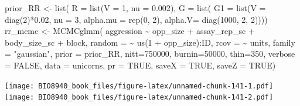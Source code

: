 \documentclass[
  12pt,
]{book}
\newenvironment{Shaded}{\begin{snugshade}}{\end{snugshade}}
\newcommand{\AttributeTok}[1]{\textcolor[rgb]{0.77,0.63,0.00}{#1}}
\newcommand{\ConstantTok}[1]{\textcolor[rgb]{0.00,0.00,0.00}{#1}}
\newcommand{\DecValTok}[1]{\textcolor[rgb]{0.00,0.00,0.81}{#1}}
\newcommand{\FloatTok}[1]{\textcolor[rgb]{0.00,0.00,0.81}{#1}}
\newcommand{\FunctionTok}[1]{\textcolor[rgb]{0.00,0.00,0.00}{#1}}
\newcommand{\NormalTok}[1]{#1}
\newcommand{\OtherTok}[1]{\textcolor[rgb]{0.56,0.35,0.01}{#1}}
\newcommand{\SpecialCharTok}[1]{\textcolor[rgb]{0.00,0.00,0.00}{#1}}
\newcommand{\StringTok}[1]{\textcolor[rgb]{0.31,0.60,0.02}{#1}}
\begin{document}
\begin{Shaded}
\begin{Highlighting}[]
\NormalTok{prior\_RR }\OtherTok{\textless{}{-}} \FunctionTok{list}\NormalTok{(}
  \AttributeTok{R =} \FunctionTok{list}\NormalTok{(}\AttributeTok{V =} \DecValTok{1}\NormalTok{, }\AttributeTok{nu =} \FloatTok{0.002}\NormalTok{),}
  \AttributeTok{G =} \FunctionTok{list}\NormalTok{(}
    \AttributeTok{G1 =} \FunctionTok{list}\NormalTok{(}\AttributeTok{V =} \FunctionTok{diag}\NormalTok{(}\DecValTok{2}\NormalTok{)}\SpecialCharTok{*}\FloatTok{0.02}\NormalTok{, }\AttributeTok{nu =} \DecValTok{3}\NormalTok{,}
\AttributeTok{alpha.mu =} \FunctionTok{rep}\NormalTok{(}\DecValTok{0}\NormalTok{, }\DecValTok{2}\NormalTok{),}
\AttributeTok{alpha.V=} \FunctionTok{diag}\NormalTok{(}\DecValTok{1000}\NormalTok{, }\DecValTok{2}\NormalTok{, }\DecValTok{2}\NormalTok{))))}
\NormalTok{rr\_mcmc }\OtherTok{\textless{}{-}} \FunctionTok{MCMCglmm}\NormalTok{(}
\NormalTok{  aggression }\SpecialCharTok{\textasciitilde{}}\NormalTok{ opp\_size }\SpecialCharTok{+}\NormalTok{ assay\_rep\_sc }\SpecialCharTok{+}\NormalTok{ body\_size\_sc }\SpecialCharTok{+}\NormalTok{ block,}
  \AttributeTok{random =} \SpecialCharTok{\textasciitilde{}} \FunctionTok{us}\NormalTok{(}\DecValTok{1} \SpecialCharTok{+}\NormalTok{ opp\_size)}\SpecialCharTok{:}\NormalTok{ID,}
  \AttributeTok{rcov =} \SpecialCharTok{\textasciitilde{}}\NormalTok{ units,}
\AttributeTok{family =} \StringTok{"gaussian"}\NormalTok{,}
\AttributeTok{prior =}\NormalTok{ prior\_RR,}
\AttributeTok{nitt=}\DecValTok{750000}\NormalTok{,}
\AttributeTok{burnin=}\DecValTok{50000}\NormalTok{,}
\AttributeTok{thin=}\DecValTok{350}\NormalTok{,}
\AttributeTok{verbose =} \ConstantTok{FALSE}\NormalTok{,}
\AttributeTok{data =}\NormalTok{ unicorns,}
\AttributeTok{pr =} \ConstantTok{TRUE}\NormalTok{,}
\AttributeTok{saveX =} \ConstantTok{TRUE}\NormalTok{, }\AttributeTok{saveZ =} \ConstantTok{TRUE}\NormalTok{)}
\end{Highlighting}
\end{Shaded}

\begin{Shaded}
\end{Shaded}

\texttt{[image: BIO8940\_book\_files/figure-latex/unnamed-chunk-141-1.pdf]} \texttt{[image: BIO8940\_book\_files/figure-latex/unnamed-chunk-141-2.pdf]}
\end{document}
